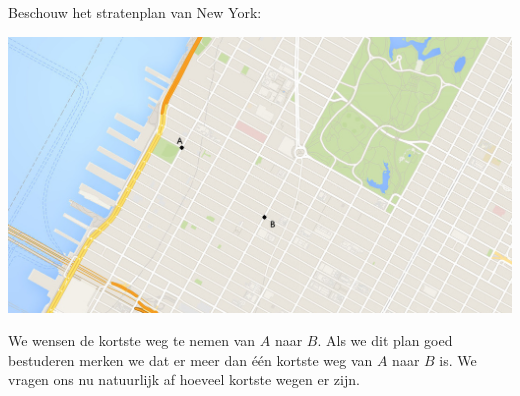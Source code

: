 \documentclass[12pt,a4,twoside]{article}
\begin{document}
Beschouw het stratenplan van New York:
\begin{center}
\includegraphics[width=1\textwidth]{NY_grid}
\end{center}

We wensen de kortste weg te nemen van $A$ naar $B$. Als we dit plan goed bestuderen merken we dat er meer dan één kortste weg van $A$ naar $B$ is. We vragen ons nu natuurlijk af hoeveel kortste wegen er zijn.
\end{document}
